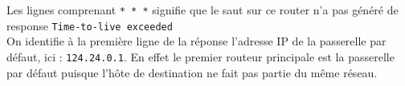 Les lignes comprenant \texttt{* * *} signifie que le saut sur ce router n'a pas généré de response \texttt{Time-to-live exceeded}\\
On identifie à la première ligne de la réponse l'adresse IP de la passerelle par défaut, ici : \texttt{124.24.0.1}. En effet le premier routeur principale est la passerelle par défaut puisque l'hôte de destination ne fait pas partie du même réseau.
